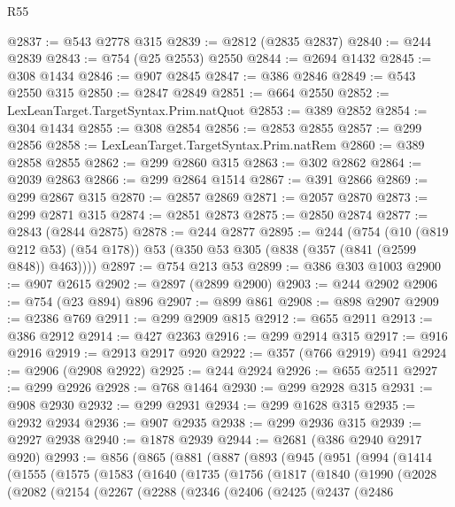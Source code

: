 \begin{lexlean}{R55}
\begin{coremodule}
@2837 := @543 @2778 @315
@2839 := @2812 (@2835 @2837)
@2840 := @244 @2839
@2843 := @754 (@25 @2553) @2550
@2844 := @2694 @1432
@2845 := @308 @1434
@2846 := @907 @2845
@2847 := @386 @2846
@2849 := @543 @2550 @315
@2850 := @2847 @2849
@2851 := @664 @2550
@2852 := LexLeanTarget.TargetSyntax.Prim.natQuot
@2853 := @389 @2852
@2854 := @304 @1434
@2855 := @308 @2854
@2856 := @2853 @2855
@2857 := @299 @2856
@2858 := LexLeanTarget.TargetSyntax.Prim.natRem
@2860 := @389 @2858 @2855
@2862 := @299 @2860 @315
@2863 := @302 @2862
@2864 := @2039 @2863
@2866 := @299 @2864 @1514
@2867 := @391 @2866
@2869 := @299 @2867 @315
@2870 := @2857 @2869
@2871 := @2057 @2870
@2873 := @299 @2871 @315
@2874 := @2851 @2873
@2875 := @2850 @2874
@2877 := @2843 (@2844 @2875)
@2878 := @244 @2877
@2895 := @244
    (@754
      (@10 (@819 @212 @53) (@54 @178))
      @53
      (@350 @53 @305 (@838 (@357 (@841 (@2599 @848)) @463))))
@2897 := @754 @213 @53
@2899 := @386 @303 @1003
@2900 := @907 @2615
@2902 := @2897 (@2899 @2900)
@2903 := @244 @2902
@2906 := @754 (@23 @894) @896
@2907 := @899 @861
@2908 := @898 @2907
@2909 := @2386 @769
@2911 := @299 @2909 @815
@2912 := @655 @2911
@2913 := @386 @2912
@2914 := @427 @2363
@2916 := @299 @2914 @315
@2917 := @916 @2916
@2919 := @2913 @2917 @920
@2922 := @357 (@766 @2919) @941
@2924 := @2906 (@2908 @2922)
@2925 := @244 @2924
@2926 := @655 @2511
@2927 := @299 @2926
@2928 := @768 @1464
@2930 := @299 @2928 @315
@2931 := @908 @2930
@2932 := @299 @2931
@2934 := @299 @1628 @315
@2935 := @2932 @2934
@2936 := @907 @2935
@2938 := @299 @2936 @315
@2939 := @2927 @2938
@2940 := @1878 @2939
@2944 := @2681 (@386 @2940 @2917 @920)
@2993 := @856
    (@865
      (@881
        (@887
          (@893
            (@945
              (@951
                (@994
                  (@1414
                    (@1555
                      (@1575
                        (@1583
                          (@1640
                            (@1735
                              (@1756
                                (@1817
                                  (@1840
                                    (@1990
                                      (@2028
                                        (@2082
                                          (@2154
                                            (@2267
                                              (@2288
                                                (@2346
                                                  (@2406
                                                    (@2425
                                                      (@2437
                                                        (@2486

\end{coremodule}
\end{lexlean}
